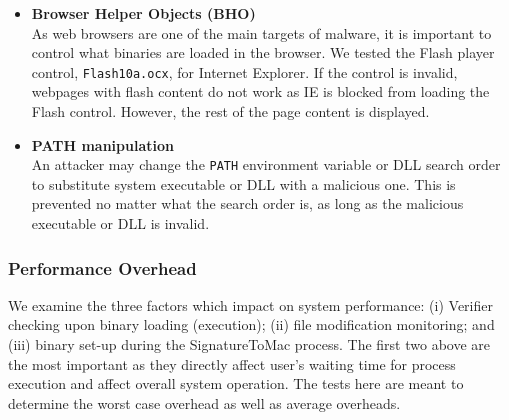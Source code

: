 \begin{itemize}
\item {\bf Browser Helper Objects (BHO)} \\
As web browsers are one of the main targets of malware,
it is important to control what binaries are loaded in the browser.
We tested the Flash player control, {\tt Flash10a.ocx}, for Internet Explorer.
If the control is invalid, webpages with flash content do not work as
IE is blocked from loading the Flash control.
However, the rest of the page content is displayed.

\item {\bf PATH manipulation} \\
An attacker may change the {\tt PATH} environment variable or DLL
search order to substitute system executable or DLL with a malicious one.
This is prevented no matter what the search order is, as long as
the malicious executable or DLL is invalid.

\end{itemize}



\subsubsection{Performance Overhead}

We examine the three factors which impact on system performance:
(i) Verifier checking upon binary loading (execution);
(ii) file modification monitoring; and
(iii) binary set-up during the SignatureToMac process.
The first two above are the most important as they directly
affect user's waiting time for process execution and
affect overall system operation.
The tests here are meant to determine the worst case overhead as well
as average overheads.

